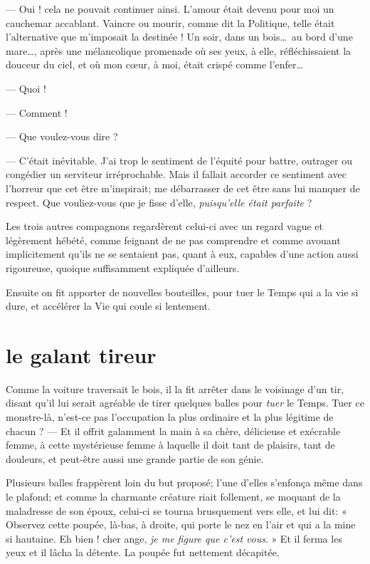 --- Oui ! cela ne pouvait continuer ainsi. L’amour était
devenu pour moi un cauchemar accablant. Vaincre ou mourir, comme dit la
Politique, telle était l’alternative que
m’imposait la destinée ! Un soir, dans un bois\ldots\ au
bord d’une mare\ldots, après une mélancolique promenade
où ses yeux, à elle, réfléchissaient la douceur du ciel, et où mon
c\oe ur, à moi, était crispé comme l’enfer\ldots

--- Quoi !

--- Comment !

--- Que voulez{}-vous dire ?

--- C’était inévitable. J’ai trop le
sentiment de l’équité pour battre, outrager ou
congédier un serviteur irréprochable. Mais il fallait accorder ce
sentiment avec l’horreur que cet être
m’inspirait; me débarrasser de cet être sans lui
manquer de respect. Que vouliez{}-vous que je fisse
d’elle, \textit{puisqu’elle était parfaite} ?

Les trois autres compagnons regardèrent celui{}-ci avec un regard vague
et légèrement hébété, comme feignant de ne pas comprendre et comme
avouant implicitement qu’ils ne se sentaient pas,
quant à eux, capables d’une action aussi rigoureuse,
quoique suffisamment expliquée d’ailleurs.

Ensuite on fit apporter de nouvelles bouteilles, pour tuer le Temps qui
a la vie si dure, et accélérer la Vie qui coule si lentement.

\quebra\section[Le galant tireur]{le galant tireur }

Comme la voiture traversait le bois, il la fit arrêter dans le voisinage
d’un tir, disant qu’il lui serait
agréable de tirer quelques balles pour \textit{tuer} le Temps. Tuer ce
monstre{}-là, n’est{}-ce pas
l’occupation la plus ordinaire et la plus légitime de
chacun ? --- Et il offrit galamment la main à sa chère, délicieuse et
exécrable femme, à cette mystérieuse femme à laquelle il doit tant de
plaisirs, tant de douleurs, et peut{}-être aussi une grande partie de
son génie.

Plusieurs balles frappèrent loin du but proposé; l’une
d’elles s’enfonça même dans le
plafond; et comme la charmante créature riait follement, se moquant de
la maladresse de son époux, celui{}-ci se tourna brusquement vers elle,
et lui dit: « Observez cette poupée, là{}-bas, à droite, qui porte le
nez en l’air et qui a la mine si hautaine. Eh bien !
cher ange, \textit{je me figure que c’est vous}. » Et il ferma
les yeux et il lâcha la détente. La poupée fut nettement décapitée.

